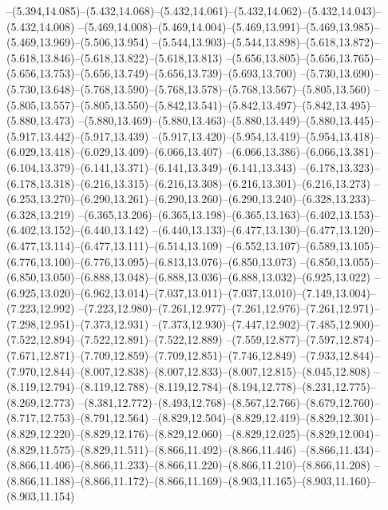   --(5.394,14.085)--(5.432,14.068)--(5.432,14.061)--(5.432,14.062)--(5.432,14.043)--(5.432,14.008)%
  --(5.469,14.008)--(5.469,14.004)--(5.469,13.991)--(5.469,13.985)--(5.469,13.969)--(5.506,13.954)%
  --(5.544,13.903)--(5.544,13.898)--(5.618,13.872)--(5.618,13.846)--(5.618,13.822)--(5.618,13.813)%
  --(5.656,13.805)--(5.656,13.765)--(5.656,13.753)--(5.656,13.749)--(5.656,13.739)--(5.693,13.700)%
  --(5.730,13.690)--(5.730,13.648)--(5.768,13.590)--(5.768,13.578)--(5.768,13.567)--(5.805,13.560)%
  --(5.805,13.557)--(5.805,13.550)--(5.842,13.541)--(5.842,13.497)--(5.842,13.495)--(5.880,13.473)%
  --(5.880,13.469)--(5.880,13.463)--(5.880,13.449)--(5.880,13.445)--(5.917,13.442)--(5.917,13.439)%
  --(5.917,13.420)--(5.954,13.419)--(5.954,13.418)--(6.029,13.418)--(6.029,13.409)--(6.066,13.407)%
  --(6.066,13.386)--(6.066,13.381)--(6.104,13.379)--(6.141,13.371)--(6.141,13.349)--(6.141,13.343)%
  --(6.178,13.323)--(6.178,13.318)--(6.216,13.315)--(6.216,13.308)--(6.216,13.301)--(6.216,13.273)%
  --(6.253,13.270)--(6.290,13.261)--(6.290,13.260)--(6.290,13.240)--(6.328,13.233)--(6.328,13.219)%
  --(6.365,13.206)--(6.365,13.198)--(6.365,13.163)--(6.402,13.153)--(6.402,13.152)--(6.440,13.142)%
  --(6.440,13.133)--(6.477,13.130)--(6.477,13.120)--(6.477,13.114)--(6.477,13.111)--(6.514,13.109)%
  --(6.552,13.107)--(6.589,13.105)--(6.776,13.100)--(6.776,13.095)--(6.813,13.076)--(6.850,13.073)%
  --(6.850,13.055)--(6.850,13.050)--(6.888,13.048)--(6.888,13.036)--(6.888,13.032)--(6.925,13.022)%
  --(6.925,13.020)--(6.962,13.014)--(7.037,13.011)--(7.037,13.010)--(7.149,13.004)--(7.223,12.992)%
  --(7.223,12.980)--(7.261,12.977)--(7.261,12.976)--(7.261,12.971)--(7.298,12.951)--(7.373,12.931)%
  --(7.373,12.930)--(7.447,12.902)--(7.485,12.900)--(7.522,12.894)--(7.522,12.891)--(7.522,12.889)%
  --(7.559,12.877)--(7.597,12.874)--(7.671,12.871)--(7.709,12.859)--(7.709,12.851)--(7.746,12.849)%
  --(7.933,12.844)--(7.970,12.844)--(8.007,12.838)--(8.007,12.833)--(8.007,12.815)--(8.045,12.808)%
  --(8.119,12.794)--(8.119,12.788)--(8.119,12.784)--(8.194,12.778)--(8.231,12.775)--(8.269,12.773)%
  --(8.381,12.772)--(8.493,12.768)--(8.567,12.766)--(8.679,12.760)--(8.717,12.753)--(8.791,12.564)%
  --(8.829,12.504)--(8.829,12.419)--(8.829,12.301)--(8.829,12.220)--(8.829,12.176)--(8.829,12.060)%
  --(8.829,12.025)--(8.829,12.004)--(8.829,11.575)--(8.829,11.511)--(8.866,11.492)--(8.866,11.446)%
  --(8.866,11.434)--(8.866,11.406)--(8.866,11.233)--(8.866,11.220)--(8.866,11.210)--(8.866,11.208)%
  --(8.866,11.188)--(8.866,11.172)--(8.866,11.169)--(8.903,11.165)--(8.903,11.160)--(8.903,11.154)%
